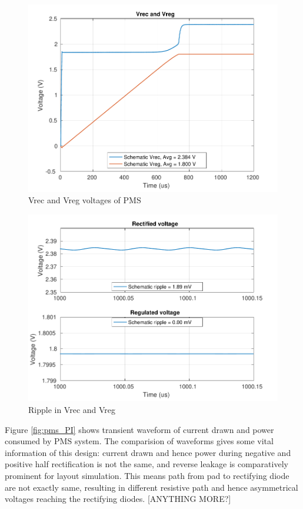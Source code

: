 \documentclass[12pt,a4paper,UKenglish]{article}
\begin{document}
\begin{figure} [H]
  \centering
  \includegraphics[width=\textwidth]{img/pms/pms_Vout.pdf} 
 \caption{Vrec and Vreg voltages of PMS} 
\label{fig:pms_vout} 
\end{figure}

\begin{figure} [H]
  \centering
  \includegraphics[width=\textwidth]{img/pms/pms_ripple.pdf} 
 \caption{Ripple in Vrec and Vreg} 
\label{fig:pms_ripple} 
\end{figure}

Figure \ref{fig:pms_PI} shows transient waveform of current drawn and power consumed by PMS system. The comparision of waveforms gives some vital information of this design: current drawn and hence power during negative and positive half rectification is not the same, and reverse leakage is comparatively prominent  for layout simulation. This means path from pad to rectifying diode are not exactly same, resulting in different resistive path and hence asymmetrical voltages reaching the rectifying diodes. [ANYTHING MORE?]\\
\end{document}
